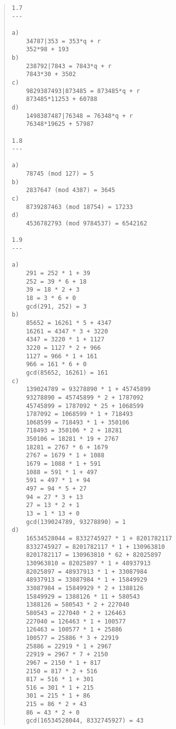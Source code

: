 \documentclass[12pt, a4paper, final]{report}
\begin{document}
\begin{quote}
\begin{verbatim}
1.7
---

a)
    34787|353 = 353*q + r
    352*98 + 193
b)
    238792|7843 = 7843*q + r
    7843*30 + 3502
c)
    9829387493|873485 = 873485*q + r
    873485*11253 + 60788
d)
    1498387487|76348 = 76348*q + r
    76348*19625 + 57987

1.8
---

a)
    78745 (mod 127) = 5
b)
    2837647 (mod 4387) = 3645
c)
    8739287463 (mod 18754) = 17233
d)
    4536782793 (mod 9784537) = 6542162

1.9
---

a)
    291 = 252 * 1 + 39
    252 = 39 * 6 + 18
    39 = 18 * 2 + 3
    18 = 3 * 6 + 0
    gcd(291, 252) = 3
b)
    85652 = 16261 * 5 + 4347
    16261 = 4347 * 3 + 3220
    4347 = 3220 * 1 + 1127
    3220 = 1127 * 2 + 966
    1127 = 966 * 1 + 161
    966 = 161 * 6 + 0
    gcd(85652, 16261) = 161
c)
    139024789 = 93278890 * 1 + 45745899
    93278890 = 45745899 * 2 + 1787092
    45745899 = 1787092 * 25 + 1068599
    1787092 = 1068599 * 1 + 718493
    1068599 = 718493 * 1 + 350106
    718493 = 350106 * 2 + 18281
    350106 = 18281 * 19 + 2767
    18281 = 2767 * 6 + 1679
    2767 = 1679 * 1 + 1088
    1679 = 1088 * 1 + 591
    1088 = 591 * 1 + 497
    591 = 497 * 1 + 94
    497 = 94 * 5 + 27
    94 = 27 * 3 + 13
    27 = 13 * 2 + 1
    13 = 1 * 13 + 0
    gcd(139024789, 93278890) = 1
d)
    16534528044 = 8332745927 * 1 + 8201782117
    8332745927 = 8201782117 * 1 + 130963810
    8201782117 = 130963810 * 62 + 82025897
    130963810 = 82025897 * 1 + 48937913
    82025897 = 48937913 * 1 + 33087984
    48937913 = 33087984 * 1 + 15849929
    33087984 = 15849929 * 2 + 1388126
    15849929 = 1388126 * 11 + 580543
    1388126 = 580543 * 2 + 227040
    580543 = 227040 * 2 + 126463
    227040 = 126463 * 1 + 100577
    126463 = 100577 * 1 + 25886
    100577 = 25886 * 3 + 22919
    25886 = 22919 * 1 + 2967
    22919 = 2967 * 7 + 2150
    2967 = 2150 * 1 + 817
    2150 = 817 * 2 + 516
    817 = 516 * 1 + 301
    516 = 301 * 1 + 215
    301 = 215 * 1 + 86
    215 = 86 * 2 + 43
    86 = 43 * 2 + 0
    gcd(16534528044, 8332745927) = 43

\end{verbatim}
\end{quote}
\end{document}
